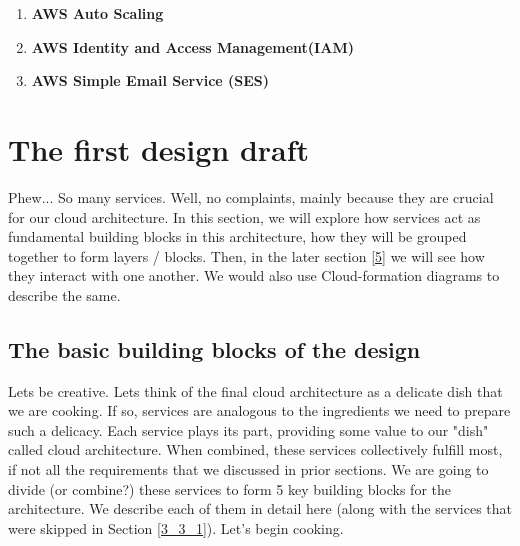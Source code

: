 \documentclass{article}
\begin{document}
\begin{enumerate}
    \item \textbf{AWS Auto Scaling} \cite{autoscale}
    \item \textbf{AWS Identity and Access Management(IAM)} \cite{IAM}
    \item \textbf{AWS Simple Email Service (SES)} \cite{ses}
\end{enumerate}
\newpage
\section{The first design draft} \label{4_1}
Phew... So many services. Well, no complaints, mainly because they are crucial for our cloud architecture. In this section, we will explore how services act as fundamental building blocks in this architecture, how they will be grouped together to form layers / blocks. Then, in the later section \ref{5} we will see how they interact with one another. We would also use Cloud-formation diagrams to describe the same. 

\subsection{The basic building blocks of the design}
Lets be creative. Lets think of the final cloud architecture as a delicate dish that we are cooking. If so, services are analogous to the ingredients we need to prepare such a delicacy. Each service plays its part, providing some value to our "dish" called cloud architecture. When combined, these services collectively fulfill most, if not all the requirements that we discussed in prior sections. We are going to divide (or combine?) these services to form 5 key building blocks for the architecture. We describe each of them in detail here (along with the services that were skipped in Section \ref{3_3_1}). Let's begin cooking. 
\end{document}
